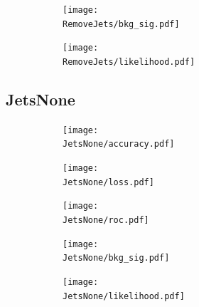 \documentclass[../../main/main.tex]{subfiles}
\begin{document}
\begin{figure}[H]
  \centering
  \begin{subfigure}[t]{0.5\textwidth}
    \centering
    \texttt{[image: \\RemoveJets/bkg\_sig.pdf]}
    \caption{\captionBkgSig}    
    \label{fig:RemoveJets_bkg_sig}
  \end{subfigure}
  \vspace{0.01cm}
  \begin{subfigure}[t]{0.5\textwidth}
    \centering
    \texttt{[image: \\RemoveJets/likelihood.pdf]}
    \caption{\captionLik}    
    \label{fig:RemoveJets_likelihood}
  \end{subfigure}
  \caption{}
  \label{fig:RemoveJets_Z}
\end{figure}

\subsection{JetsNone}
\label{sec:fillzero}


\begin{figure}[H]
  \centering
  \begin{subfigure}[t]{0.5\textwidth}
    \centering
    \texttt{[image: \\JetsNone/accuracy.pdf]}
    \caption{\captionAcc}
    \label{fig:JetsNone_acc}
  \end{subfigure}
  \vspace{0.01cm}
  \begin{subfigure}[t]{0.5\textwidth}
    \centering
    \texttt{[image: \\JetsNone/loss.pdf]}
    \caption{\captionLoss}
    \label{fig:JetsNone_loss}
  \end{subfigure}
  \begin{subfigure}[t]{0.5\textwidth}
    \centering
    \texttt{[image: \\JetsNone/roc.pdf]}
    \caption{\captionROC}
    \label{fig:JetsNone_roc}
  \end{subfigure}
  \caption{}
  \label{fig:JetsNone_1}  
\end{figure}

\begin{figure}[H]
  \centering
  \begin{subfigure}[t]{0.5\textwidth}
    \centering
    \texttt{[image: \\JetsNone/bkg\_sig.pdf]}
    \caption{\captionBkgSig}    
    \label{fig:JetsNone_bkg_sig}
  \end{subfigure}
  \vspace{0.01cm}
  \begin{subfigure}[t]{0.5\textwidth}
    \centering
    \texttt{[image: \\JetsNone/likelihood.pdf]}
    \caption{\captionLik}    
    \label{fig:JetsNone_likelihood}
  \end{subfigure}
  \caption{}
  \label{fig:JetsNone_Z}
\end{figure}
\end{document}
